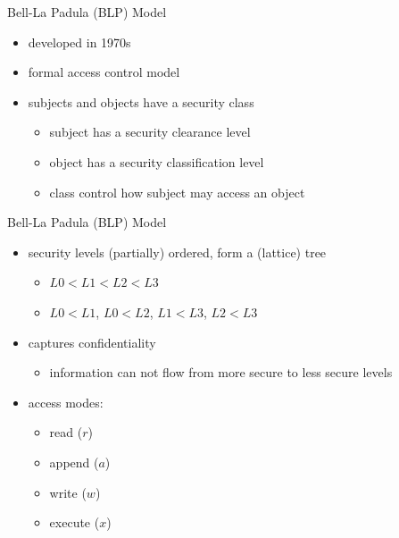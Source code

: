 \documentclass{beamer}
\begin{document}
\begin{frame}{Bell-La Padula (BLP) Model}
  \begin{itemize}
  \item developed in 1970s
  \item formal access control model
  \item subjects and objects have a \alert{security class}
    \begin{itemize}
    \item subject has a \alert{security clearance} level
    \item object has a \alert{security classification} level
    \item class control how subject may access an object
    \end{itemize}
  \end{itemize}
\end{frame}

\begin{frame}{Bell-La Padula (BLP) Model}
  \begin{itemize}
  \item security levels (partially) ordered, form a (lattice) tree
    \begin{itemize}
    \item $L0 < L1 < L2 < L3$
    \item $L0 < L1$, $L0 < L2$, $L1 < L3$, $L2 < L3$
    \end{itemize}
  \item captures \alert{confidentiality}
    \begin{itemize}
      \item information can not flow from more secure to 
        less secure levels
    \end{itemize}
    \item access modes:
    \begin{itemize}
    \item read ($r$)
    \item append ($a$)
    \item write ($w$)
    \item execute ($x$)
    \end{itemize}
  \end{itemize}
\end{frame}
\end{document}
